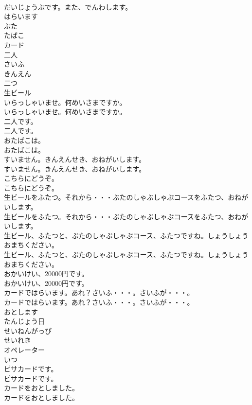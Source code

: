 \documentclass[8pt]{extreport}
\begin{document}
\begin{CJK}{UTF8}{min}
\\	だいじょうぶです。また、でんわします。 
\\	はらいます
\\	ぶた
\\	たばこ
\\	カード
\\	二人
\\	さいふ
\\	きんえん
\\	二つ
\\	生ビール
\\	いらっしゃいませ。何めいさまですか。	
\\	いらっしゃいませ。何めいさまですか。 
\\	二人です。	
\\	二人です。 
\\	おたばこは。	
\\	おたばこは。 
\\	すいません。きんえんせき、おねがいします。	
\\	すいません。きんえんせき、おねがいします。 
\\	こちらにどうぞ。	
\\	こちらにどうぞ。 
\\	生ビールをふたつ。それから・・・ぶたのしゃぶしゃぶコースをふたつ、おねがいします。	
\\	生ビールをふたつ。それから・・・ぶたのしゃぶしゃぶコースをふたつ、おねがいします。 
\\	生ビール、ふたつと、ぶたのしゃぶしゃぶコース、ふたつですね。しょうしょうおまちください。	
\\	生ビール、ふたつと、ぶたのしゃぶしゃぶコース、ふたつですね。しょうしょうおまちください。 
\\	おかいけい、20000円です。	
\\	おかいけい、20000円です。 
\\	カードではらいます。あれ？さいふ・・・。さいふが・・・。	
\\	カードではらいます。あれ？さいふ・・・。さいふが・・・。 
\\	おとします
\\	たんじょう日
\\	せいねんがっぴ
\\	せいれき
\\	オペレーター
\\	いつ
\\	ピサカードです。	
\\	ピサカードです。 
\\	カードをおとしました。	
\\	カードをおとしました。 

\end{CJK}
\end{document}

